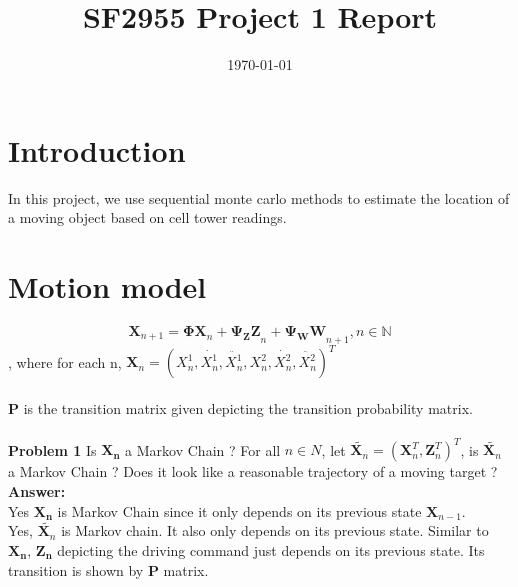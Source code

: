 \documentclass[a4paper]{article}
\title{SF2955 Project 1 Report}
\author{}
\date{\today}
\begin{document}
\maketitle



\section*{Introduction}

In this project, we use sequential monte carlo methods to estimate the location of a moving object based on cell tower readings.

\section*{Motion model}

\begin{equation}
\boldsymbol{X}_{n + 1} = \boldsymbol{\Phi X}_n + \boldsymbol{\Psi_Z Z}_n + \boldsymbol{\Psi_W W}_{n + 1}, n \in \mathbb{N} \label{trans_model}
\end{equation}
, where for each n, $\boldsymbol{X}_n = (X_n^1, \dot{X_n^1}, \ddot{X_n^1}, X_n^2, \dot{X_n^2}, \ddot{X_n^2})^T$ \\\\
$\boldsymbol{P}$ is the transition matrix given depicting the transition probability matrix.  
\\\\

\textbf{Problem 1}
Is ${\boldsymbol{X_n}}$ a Markov Chain ?  For all $n \in N$, let $\tilde{\boldsymbol{X}_n} = (\boldsymbol{X}_n^T, \boldsymbol{Z}_n^T)^T$, is $\tilde{\boldsymbol{X}_n}$ a Markov Chain ?  Does it look like a reasonable trajectory of a moving target ?\\


\textbf{Answer:} \\
Yes ${\boldsymbol{X_n}}$ is Markov Chain since it only depends on its previous state ${\boldsymbol{X}_{n-1}}$. \\
Yes, $\tilde{\boldsymbol{X}_n}$ is Markov chain. It also only depends on its previous state. Similar to  ${\boldsymbol{X_n}}$, ${\boldsymbol{Z_n}}$ depicting the driving command just depends on its previous state. Its transition is shown by $\boldsymbol{P}$ matrix. \\
\end{document}
